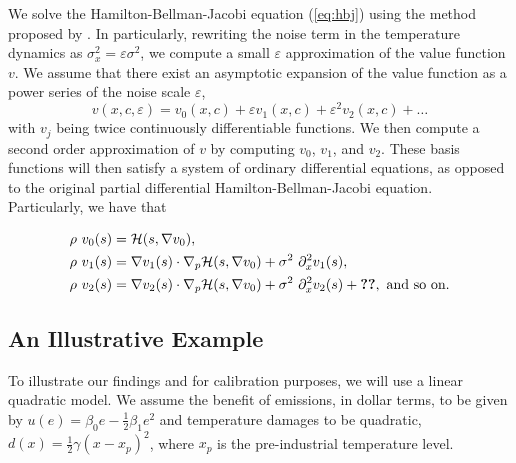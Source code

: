 \documentclass[../../main.tex]{subfiles}
\begin{document}
We solve the Hamilton-Bellman-Jacobi equation (\ref{eq:hbj}) using the method proposed by . In particularly, rewriting the noise term in the temperature dynamics as $\sigma_x^2 = \varepsilon \sigma^2$, we compute a small $\varepsilon$ approximation of the value function $v$. We assume that there exist an asymptotic expansion of the value function as a power series of the noise scale $\varepsilon$, \begin{equation}
    v(x, c, \varepsilon) = v_0(x, c) + \varepsilon v_1(x, c) + \varepsilon^2 v_2(x, c) + \ldots
\end{equation} with $v_j$ being twice continuously differentiable functions. We then compute a second order approximation of $v$ by computing $v_0$, $v_1$, and $v_2$. These basis functions will then satisfy a system of ordinary differential equations, as opposed to the original partial differential Hamilton-Bellman-Jacobi equation. Particularly, we have that

\begin{align}
    \rho \ v_0(s) &= \mathcal{H}(s, \nabla v_0), \\
    \rho \ v_1(s) &= \nabla v_1(s) \cdot \nabla_p\mathcal{H}(s, \nabla v_0) + \sigma^2 \ \partial_x^2 v_1(s), \\
    \rho \ v_2(s) &= \nabla v_2(s) \cdot \nabla_p\mathcal{H}(s,  \nabla v_0) + \sigma^2 \ \partial_x^2 v_2(s) + \textbf{??}, \text{ and so on.}
\end{align}


\subsection{An Illustrative Example}

To illustrate our findings and for calibration purposes, we will use a linear quadratic model. We assume the benefit of emissions, in dollar terms, to be given by $u(e) = \beta_0 e - \frac{1}{2} \beta_1 e^2$ and temperature damages to be quadratic, $d(x) = \frac{1}{2}\gamma (x - x_p)^2$, where $x_p$ is the pre-industrial temperature level.
\end{document}
